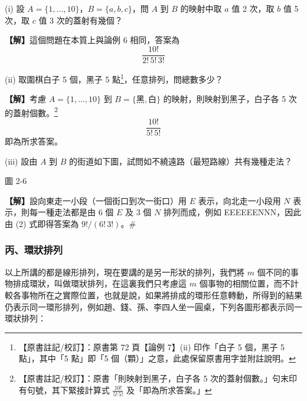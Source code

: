 \begin{discussion}\label{disc:b5s-2-7}
(i) 設 $A = \{1, \dots, 10\}$，$B = \{a, b, c\}$，問 $A$ 到 $B$ 的映射中取 $a$ 值 2 次，取 $b$ 值 5 次，取 $c$ 值 3 次的蓋射有幾個？
\par\smallskip\noindent\textbf{【解】}\quad 這個問題在本質上與論例 6 相同，答案為
\[
\frac{10!}{2! \, 5! \, 3!}
\]

\indent(ii) 取圍棋白子 5 個，黑子 5 點\label{note:b5s-ch2-p72-go-stones}\footnote{【原書註記/校訂】：原書第 72 頁【論例 7】(ii) 印作「白子 5 個，黑子 5 點」，其中「5 點」即「5 個（顆）」之意，此處保留原書用字並附註說明。}，任意排列，問總數多少？
\par\smallskip\noindent\textbf{【解】}\quad 考慮 $A = \{1, \dots, 10\}$ 到 $B = \{\text{黑}, \text{白}\}$ 的映射，則映射到黑子，白子各 5 次的蓋射個數。\label{note:b5s-ch2-p72-surjection-period}\footnote{【原書註記/校訂】：原書「則映射到黑子，白子各 5 次的蓋射個數。」句末印有句號，其下緊接計算式 $\frac{10!}{5!\,5!}$ 及「即為所求答案。」}
\[
\frac{10!}{5! \, 5!}
\]
即為所求答案。

\indent(iii) 設由 $A$ 到 $B$ 的街道如下圖，試問如不繞遠路（最短路線）共有幾種走法？

\begin{center}

\vspace{0.3em}
圖 2-6
\end{center}
\par\smallskip\noindent\textbf{【解】}\quad 設向東走一小段（一個街口到次一街口）用 $E$ 表示，向北走一小段用 $N$ 表示，則每一種走法都是由 6 個 $E$ 及 3 個 $N$ 排列而成，例如 EEEEEENNN，因此由 (2) 式即得答案為 $9! / (6! \, 3!)$。\hfill\#
\end{discussion}

\subsubsection*{丙、環狀排列}

以上所講的都是線形排列，現在要講的是另一形狀的排列，我們將 $m$ 個不同的事物排成環狀，叫做環狀排列，在這裏我們只考慮這 $m$ 個事物的相關位置，而不計較各事物所在之實際位置，也就是說，如果將排成的環形任意轉動，所得到的結果仍表示同一環形排列，例如趙、錢、孫、李四人坐一圓桌，下列各圖形都表示同一環狀排列：


